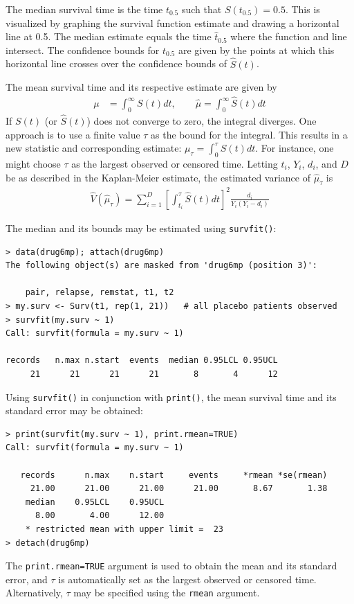 \documentclass[11pt]{article}
\begin{document}
\pagebreak

{}
\label{meanAndMedianEstimates}

The median survival time is the time $t_{0.5}$ such that $S(t_{0.5}) = 0.5$. This is visualized by graphing the survival function estimate and drawing a horizontal line at 0.5. The median estimate equals the time $\hat{t}_{0.5}$ where the function and line intersect. The confidence bounds for $t_{0.5}$ are given by the points at which this horizontal line crosses over the confidence bounds of $\hat{S}(t)$.

\noindent The mean survival time and its respective estimate are given by
\begin{align*}
\mu &= \int_0^\infty S(t)dt, \qquad\hat{\mu} = \int_0^\infty \hat{S}(t)dt
\end{align*}
If $S(t)$ (or $\hat{S}(t)$) does not converge to zero, the integral diverges. One approach is to use a finite value $\tau$ as the bound for the integral. This results in a new statistic and corresponding estimate: $\mu_\tau = \int_0^\tau S(t)dt$. For instance, one might choose $\tau$ as the largest observed or censored time. Letting $t_i$, $Y_i$, $d_i$, and $D$ be as described in the Kaplan-Meier estimate, the estimated variance of $\hat{\mu}_\tau$ is
\begin{eqnarray*}
\hat{V}(\hat{\mu}_\tau) = \sum_{i=1}^D\left[\int_{t_i}^\tau \hat{S}(t)dt\right]^2 \frac{d_i}{Y_i(Y_i-d_i)}
\end{eqnarray*}

The median and its bounds may be estimated using \texttt{survfit()}:
\begin{verbatim}
> data(drug6mp); attach(drug6mp)
The following object(s) are masked from 'drug6mp (position 3)':

    pair, relapse, remstat, t1, t2
> my.surv <- Surv(t1, rep(1, 21))   # all placebo patients observed
> survfit(my.surv ~ 1)
Call: survfit(formula = my.surv ~ 1)

records   n.max n.start  events  median 0.95LCL 0.95UCL 
     21      21      21      21       8       4      12 
\end{verbatim}
Using \texttt{survfit()} in conjunction with \texttt{print()}, the mean survival time and its standard error may be obtained:
\begin{verbatim}
> print(survfit(my.surv ~ 1), print.rmean=TRUE)
Call: survfit(formula = my.surv ~ 1)

   records      n.max    n.start     events     *rmean *se(rmean) 
     21.00      21.00      21.00      21.00       8.67       1.38 
    median    0.95LCL    0.95UCL 
      8.00       4.00      12.00 
    * restricted mean with upper limit =  23 
> detach(drug6mp)
\end{verbatim}
The \texttt{print.rmean=TRUE} argument is used to obtain the mean and its standard error, and $\tau$ is automatically set as the largest observed or censored time. Alternatively, $\tau$ may be specified using the \texttt{rmean} argument.
\end{document}
